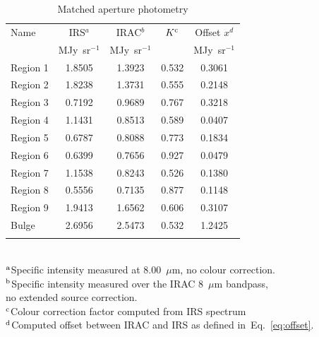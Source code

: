 \begin{table}
 \centering
 \begin{minipage}{100mm}
\caption{Matched aperture photometry}
  \begin{tabular}{lcccc}
  \hline{Name}&{IRS$^{a}$}&{IRAC$^{b}$}&{$K^{\rm c}$}&{Offset $x^d$} \\ 
{} & { MJy~sr$^{-1}$} & { MJy~sr$^{-1}$} & &  MJy~sr$^{-1}$
   \\
 \hline
 Region 1 & 1.8505 & 1.3923 & 0.532 & 0.3061
 \\ Region 2  & 1.8238 & 1.3731 & 0.555 & 0.2148
 \\ Region 3 & 0.7192 & 0.9689 & 0.767 & 0.3218
 \\ Region 4 & 1.1431 & 0.8513 & 0.589 & 0.0407
 \\  Region 5 & 0.6787 & 0.8088 & 0.773 & 0.1834
 \\  Region 6  & 0.6399 & 0.7656 & 0.927 & 0.0479
 \\  Region 7  & 1.1538 & 0.8243 & 0.526 & 0.1380
 \\ Region 8 & 0.5556 & 0.7135 & 0.877 & 0.1148
 \\  Region 9 & 1.9413 & 1.6562 & 0.606 & 0.3107 
 \\ Bulge & 2.6956 & 2.5473 & 0.532 & 1.2425\\
\hline
 \label{colourK}
\end{tabular}\\
 {$^{\rm a}$Specific intensity measured at 8.00~$\mu$m, no colour correction.\\
 $^{\rm b}$Specific intensity measured over the IRAC 8~$\mu$m bandpass,\\ no extended source correction.\\
$^{\rm c}$Colour correction factor computed from IRS spectrum\\
 $^{\rm d}$Computed offset between IRAC and IRS as defined in~Eq.~\ref{eq:offset}. }
\end{minipage}
\end{table}

